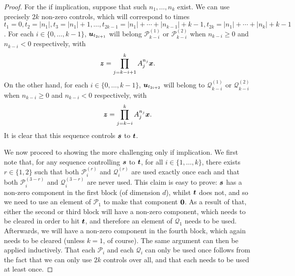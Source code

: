 \begin{proof}
For the if implication, suppose that such $n_{1}, \ldots, n_{k}$ exist.
We can use precisely $2k$ non-zero controls, which will correspond to times
$t_{1} = 0,
t_{2} = \lvert n_{1}\rvert,
t_{3} = \lvert n_{1} \rvert +1,
\ldots,
t_{2k-1} = \lvert n_{1} \rvert + \cdots + \lvert n_{k-1} \rvert + k-1,
t_{2k} = \lvert n_{1} \rvert + \cdots + \lvert n_{k} \rvert + k-1$.
For each $i \in \lbrace 0, \ldots, k-1 \rbrace$, $\boldsymbol{u}_{t_{2i+1}}$ will belong $\mathcal{P}_{k-i}^{(1)}$ or $\mathcal{P}_{k-i}^{(2)}$ when $n_{k-i} \geq 0$ and $n_{k-i} < 0$ respectively, with
\begin{equation*}
  \boldsymbol{z} = \prod\limits_{j=k-i+1}^{k} A_{j}^{n_{j}} \boldsymbol{x}.
\end{equation*}
On the other hand, for each $i \in \lbrace 0, \ldots, k-1 \rbrace$, $\boldsymbol{u}_{t_{2i+2}}$ will belong to $\mathcal{Q}_{k-i}^{(1)}$ or $\mathcal{Q}_{k-i}^{(2)}$ when $n_{k-i} \geq 0$ and $n_{k-i} < 0$ respectively, with
\begin{equation*}
  \boldsymbol{z} = \prod\limits_{j=k-i}^{k} A_{j}^{n_{j}} \boldsymbol{x}.
\end{equation*}
It is clear that this sequence controls $\boldsymbol{s}$ to $\boldsymbol{t}$.

We now proceed to showing the more challenging only if implication. We first note that, for any sequence controlling $\boldsymbol{s}$ to $\boldsymbol{t}$,
for all $i \in \lbrace 1, \ldots, k \rbrace$,
there exists $r \in \lbrace 1, 2 \rbrace$ such that both $\mathcal{P}_{i}^{(r)}$ and $\mathcal{Q}_{i}^{(r)}$ are used exactly once each
and that both $\mathcal{P}_{i}^{(3-r)}$ and $\mathcal{Q}_{i}^{(3-r)}$ are never used.
This claim is easy to prove: $\boldsymbol{s}$ has a non-zero component in the first block (of dimension $d$), whilst $\boldsymbol{t}$ does not,
and so we need to use an element of $\mathcal{P}_{1}$ to make that component $\boldsymbol{0}$.
As a result of that, either the second or third block will have a non-zero component, which needs to be cleared in order to hit $\boldsymbol{t}$,
and therefore an element of $\mathcal{Q}_{1}$ needs to be used. Afterwards, we will have a non-zero component in the fourth block,
which again needs to be cleared (unless $k=1$, of course). The same argument can then be applied inductively.
That each $\mathcal{P}_{i}$ and each $\mathcal{Q}_{i}$ can only be used once follows from the fact that we can only use $2k$ controls over all,
and that each needs to be used at least once.


\end{proof}
